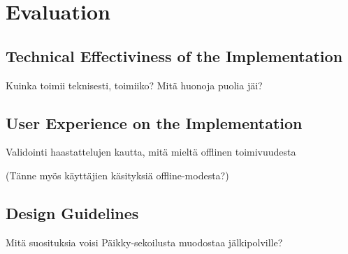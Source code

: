 
\chapter{Evaluation}

\section{Technical Effectiviness of the Implementation}
Kuinka toimii teknisesti, toimiiko? Mitä huonoja puolia jäi?

\section{User Experience on the Implementation}
Validointi haastattelujen kautta, mitä mieltä offlinen toimivuudesta

(Tänne myös käyttäjien käsityksiä offline-modesta?)

\section{Design Guidelines}
Mitä suosituksia voisi Päikky-sekoilusta muodostaa jälkipolville?

